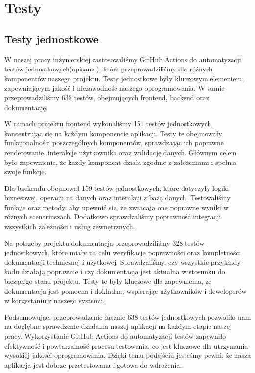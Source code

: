 
\chapter{Testy}
\label{ch:testy}

\section{Testy jednostkowe}
\label{sec:testy-jednostkowe}
W naszej pracy inżynierskiej zastosowaliśmy GitHub Actions do automatyzacji testów jednostkowych(opisane \pageref{sec:github-actions} ), które przeprowadziliśmy dla różnych komponentów naszego projektu.
Testy jednostkowe były kluczowym elementem, zapewniającym jakość i niezawodność naszego oprogramowania. 
W sumie przeprowadziliśmy 638 testów, obejmujących frontend, backend oraz dokumentację.\newline

\indent W ramach projektu frontend wykonaliśmy 151 testów jednostkowych, koncentrując się na każdym komponencie aplikacji. Testy te obejmowały funkcjonalności poszczególnych 
komponentów, sprawdzając ich poprawne renderowanie, interakcje użytkownika oraz walidację danych. Głównym celem było zapewnienie, że każdy komponent działa zgodnie z założeniami i spełnia swoje funkcje.\newline

\indent Dla backendu obejmował 159 testów jednostkowych, które dotyczyły logiki biznesowej, operacji na danych oraz interakcji z bazą danych. 
Testowaliśmy funkcje oraz metody, aby upewnić się, że zwracają one poprawne wyniki w różnych scenariuszach. Dodatkowo sprawdzaliśmy poprawność integracji wszystkich zależności i usług zewnętrznych.\newline

\indent Na potrzeby projektu dokumentacja przeprowadziliśmy 328 testów jednostkowych, które miały na celu weryfikację poprawności oraz kompletności dokumentacji technicznej i użytkowej.
 Sprawdzaliśmy, czy wszystkie przykłady kodu działają poprawnie i czy dokumentacja jest aktualna w stosunku do bieżącego stanu projektu. Testy te były kluczowe dla zapewnienia, że dokumentacja 
 jest pomocna i dokładna, wspierając użytkowników i deweloperów w korzystaniu z naszego systemu.\newline

 \indent Podsumowując, przeprowadzenie łącznie 638 testów jednostkowych pozwoliło nam na dogłębne sprawdzenie działania naszej aplikacji na każdym etapie naszej pracy. 
Wykorzystanie GitHub Actions do automatyzacji testów zapewniło efektywność i powtarzalność procesu testowania, co jest kluczowe dla utrzymania wysokiej jakości oprogramowania. 
Dzięki temu podejściu jesteśmy pewni, że nasza aplikacja jest dobrze przetestowana i gotowa do wdrożenia.\newline

